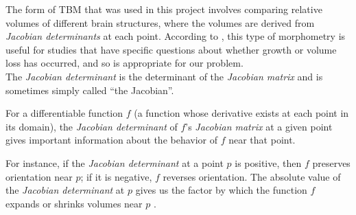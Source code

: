 The form of TBM that was used in this project involves comparing
relative volumes of different brain structures, where the volumes are
derived from \textit{Jacobian determinants} at each point. According
to \cite{ashburner}, this type of morphometry is useful for studies
that have specific questions about whether growth or volume loss has
occurred, and so is appropriate for our problem.\\

The \textit{Jacobian determinant} is the determinant of the
\textit{Jacobian matrix} and is sometimes simply called ``the
Jacobian''.

For a differentiable function $f$ (a function whose derivative exists
at each point in its domain), the \textit{Jacobian determinant} of
$f$'s \textit{Jacobian matrix} at a given point gives important
information about the behavior of $f$ near that point.

For instance, if the \textit{Jacobian determinant} at a point $p$ is
positive, then $f$ preserves orientation near $p$; if it is negative,
$f$ reverses orientation. The absolute value of the \textit{Jacobian
  determinant} at $p$ gives us the factor by which the function $f$
expands or shrinks volumes near $p$ \cite{jacobian}.




